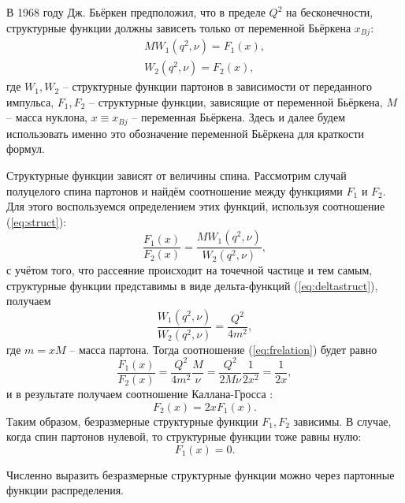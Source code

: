 \documentclass{extarticle}
\begin{document}
В 1968 году Дж. Бьёркен предположил, что в пределе $Q^2$ на бесконечности, структурные функции должны зависеть только от переменной Бьёркена $x_{Bj}$:
\begin{equation}
	\begin{split}
	MW_1(q^2, \nu) = F_1 (x) ,\\
	W_2(q^2, \nu) = F_2(x),
	\end{split}
	\label{eq:struct}
\end{equation}
где  $W_1, W_2$ -- структурные функции партонов в зависимости от переданного импульса, $F_1, F_2$ -- структурные функции, зависящие от переменной Бьёркена, $M$ -- масса нуклона, $x \equiv x_{Bj}$ -- переменная Бьёркена. Здесь и далее будем использовать именно это обозначение переменной Бьёркена для краткости формул.

Структурные функции зависят от величины спина. Рассмотрим случай полуцелого спина партонов и найдём соотношение между функциями $F_1$ и $F_2$. Для этого воспользуемся определением этих функций, используя соотношение (\ref{eq:struct}):
\begin{equation}
	\frac{F_1(x)}{F_2(x)} = \frac{MW_1(q^2, \nu)}{W_2(q^2, \nu)},
	\label{eq:frelation}
\end{equation}
с учётом того, что рассеяние происходит на точечной частице и тем самым, структурные функции представимы в виде дельта-функций (\ref{eq:deltastruct}), получаем
\begin{equation}
	\frac{W_1(q^2, \nu)}{W_2(q^2, \nu)} = \frac{Q^2}{4m^2},
\end{equation}
где $m = xM$ -- масса партона. Тогда соотношение (\ref{eq:frelation}) будет равно
\begin{equation}
	\frac{F_1(x)}{F_2(x)} =  \frac{Q^2}{4m^2} \frac{M}{\nu} =  \frac{Q^2}{2M\nu} \frac{1}{2x^2} = \frac{1}{2x},
\end{equation}
и в результате получаем соотношение Каллана-Гросса \cite{Callan-Gross}:
\begin{equation}
		F_2(x) = 2xF_1(x).
\end{equation}
Таким образом, безразмерные структурные функции $F_1, F_2$ зависимы. В случае, когда спин партонов нулевой, то структурные функции тоже равны нулю:
\begin{equation}
	F_1 (x) = 0.
\end{equation}

Численно выразить безразмерные структурные функции можно через партонные функции распределения.
\end{document}

